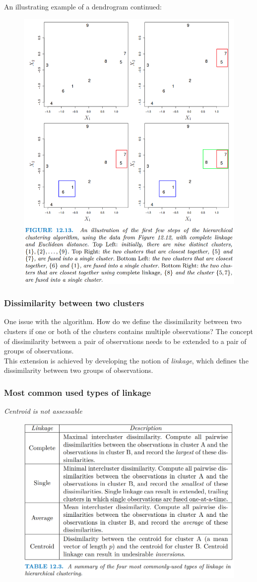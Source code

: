 \documentclass[11pt]{article}
\begin{document}
\noindent An illustrating example of a dendrogram continued:
\begin{figure}[H]
    \centering
    \includegraphics[width=0.7\linewidth]{Hierarchical clustering - algorithm dendrogram example.png}
\end{figure}

\subsubsection*{Dissimilarity between two clusters}
\noindent One issue with the algorithm. How do we define the dissimilarity between two clusters if one or both of the clusters contains multiple observations? The concept of dissimilarity between a pair of observations needs to be extended to a pair of groups of observations. \\

\noindent This extension is achieved by developing the notion of \textit{linkage}, which defines the dissimilarity between two groups of observations.

\subsubsection*{Most common used types of linkage}
\noindent \textit{Centroid is not assessable}
\begin{figure}[H]
    \centering
    \includegraphics[width=0.7\linewidth]{Hierarchical clustering - types of linkage.png}
\end{figure}
\end{document}
